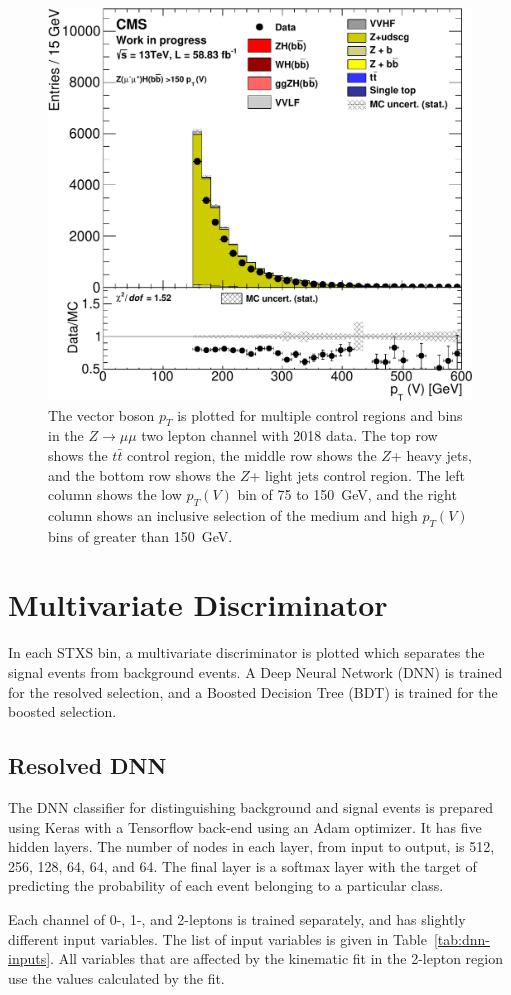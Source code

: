 \begin{figure}
  \includegraphics[width=0.42\linewidth]{figures/2018_Zmm/Zlf_medhigh_Zmm__Vpt_.pdf}
  \caption[Control region plots for two muons in 2018]{
    The vector boson $p_T$ is plotted for multiple control regions and bins in
    the $Z\rightarrow \mu\mu$ two lepton channel with 2018 data.
    The top row shows the $t\bar{t}$ control region,
    the middle row shows the $Z$+ heavy jets,
    and the bottom row shows the $Z$+ light jets control region.
    The left column shows the low $p_T(V)$ bin of 75 to \SI{150}{GeV},
    and the right column shows an inclusive selection of
    the medium and high $p_T(V)$ bins of greater than \SI{150}{GeV}.
  }
  \label{fig:2018_Zmm_vpt}
\end{figure}

\section{Multivariate Discriminator}

In each STXS bin, a multivariate discriminator is plotted which separates
the signal events from background events.
A Deep Neural Network (DNN) is trained for the resolved selection,
and a Boosted Decision Tree (BDT) is trained for the boosted selection.

\subsection{Resolved DNN}

The DNN classifier for distinguishing background and signal events is prepared using
Keras with a Tensorflow back-end using an Adam optimizer.
It has five hidden layers.
The number of nodes in each layer, from input to output, is 512, 256, 128, 64, 64, and 64.
The final layer is a softmax layer with the target of predicting the probability
of each event belonging to a particular class.

Each channel of 0-, 1-, and 2-leptons is trained separately,
and has slightly different input variables.
The list of input variables is given in Table~\ref{tab:dnn-inputs}.
All variables that are affected by the kinematic fit in the 2-lepton region
use the values calculated by the fit.


